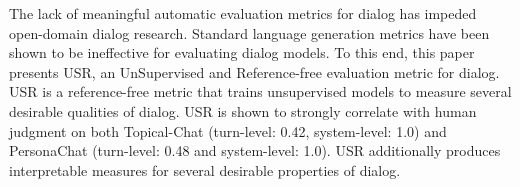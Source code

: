 The lack of meaningful automatic evaluation metrics for dialog has impeded open-domain dialog research. Standard language generation metrics have been shown to be ineffective for evaluating dialog models. To this end, this paper presents USR, an UnSupervised and Reference-free evaluation metric for dialog. USR is a reference-free metric that trains unsupervised models to measure several desirable qualities of dialog. USR is shown to strongly correlate with human judgment on both Topical-Chat (turn-level: 0.42, system-level: 1.0) and PersonaChat (turn-level: 0.48 and system-level: 1.0). USR additionally produces interpretable measures for several desirable properties of dialog.
